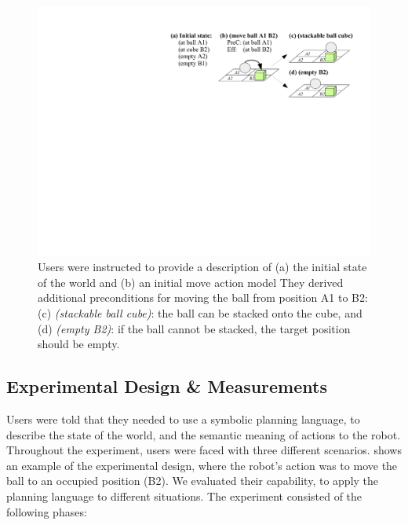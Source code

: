  
 \begin{figure}[h]
 	\centering
 	\includegraphics[width=0.65\linewidth]{figures/scenarios-exp1}
 	\caption{Users were instructed to provide a description of (a) the initial state of the world and (b) an initial move action model
 		They derived additional preconditions for moving the ball from position A1 to B2: (c) \textit{(stackable ball cube)}: the ball can be stacked onto the cube, and (d) \textit{(empty B2)}: if the ball cannot be stacked, the target position should be empty.}
 	\label{fig:scenarios-exp1}
 \end{figure}
\subsection{Experimental Design \& Measurements}
Users were told that they needed to use a symbolic planning language, to describe the state of the world, and the semantic meaning of actions to the robot. 
Throughout the experiment, users were faced with three different scenarios. 
 shows an example of the experimental design, where the robot's action was to move the ball to an occupied position (B2). 
We evaluated their capability, to apply the planning language to different situations.
The experiment consisted of the following phases:


